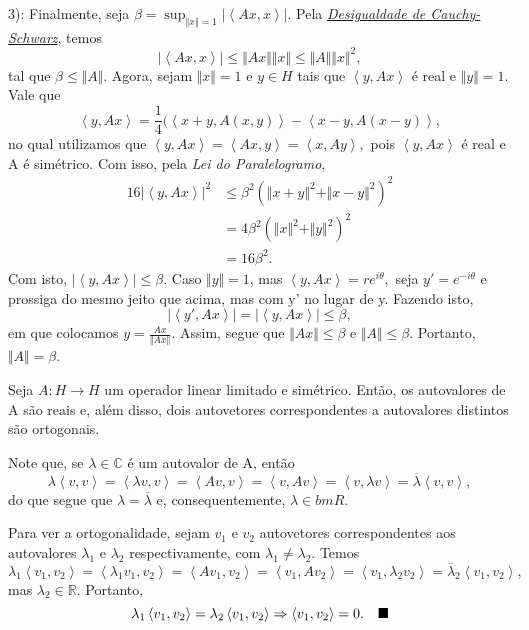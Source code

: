 \documentclass[measure_theory.tex]{subfiles}
\begin{document}
\begin{proof*}
	3): Finalmente, seja \(\beta = \sup_{\Vert x \Vert = 1}|\left< Ax, x \right>|\). Pela \hyperlink{cauchy_schwarz}{\textit{Desigualdade de Cauchy-Schwarz}}, temos
	\[
		|\left< Ax, x \right>|\leq \Vert Ax \Vert\Vert x \Vert \leq \Vert A \Vert\Vert x \Vert^{2},
	\]
	tal que \(\beta \leq \Vert A \Vert\). Agora, sejam \(\Vert x \Vert = 1\) e \(y\in H\) tais que \(\left< y, Ax \right>\) é real e \(\Vert y \Vert = 1.\) Vale que
	\[
		\left< y, Ax \right> = \frac{1}{4}(\left< x + y, A(x, y) \right> - \left< x - y, A(x-y) \right>,
	\]
	no qual utilizamos que \(\left< y, Ax \right> = \left< Ax, y \right> = \left< x, Ay \right>,\) pois \(\left< y, Ax \right>\) é real e A é simétrico. Com isso, pela \textit{Lei do Paralelogramo},
	\begin{align*}
		16|\left< y, Ax \right>|^{2} & \leq \beta ^{2}(\Vert x + y \Vert^{2} + \Vert x-y \Vert^{2})^{2} \\
		                             & = 4\beta ^{2}(\Vert x \Vert^{2} + \Vert y \Vert^{2})^{2}         \\
		                             & = 16\beta ^{2}.
	\end{align*}
	Com isto, \(|\left< y, Ax \right>|\leq \beta \). Caso \(\Vert y \Vert = 1\), mas \(\left< y, Ax \right> = re^{i\theta },\) seja \(y'= e^{-i\theta }\) e prossiga do mesmo jeito que acima, mas com y' no lugar de y. Fazendo isto,
	\[
		|\left< y', Ax \right>| = |\left< y, Ax \right>| \leq \beta ,
	\]
	em que colocamos \(y = \frac{Ax}{\Vert Ax \Vert}.\) Assim, segue que \(\Vert Ax \Vert \leq \beta \) e \(\Vert A \Vert \leq \beta \). Portanto, \(\Vert A \Vert = \beta \). \qedsymbol
\end{proof*}
\begin{prop*}
	Seja \(A:H\rightarrow H\) um operador linear limitado e simétrico. Então, os autovalores de A são reais e, além disso, dois autovetores correspondentes a autovalores distintos são ortogonais.
\end{prop*}
\begin{proof*}
	Note que, se \(\lambda \in \mathbb{C}\) é um autovalor de A, então
	\[
		\lambda \left< v, v \right> = \left< \lambda v, v \right> = \left< Av, v \right> = \left< v, Av \right> = \left< v, \lambda v \right> = \overline{\lambda }\left< v, v \right>,
	\]
	do que segue que \(\lambda  = \overline{\lambda } \) e, consequentemente, \(\lambda \in bm  R\).

	Para ver a ortogonalidade, sejam \(v_1\) e \(v_2\) autovetores correspondentes aos autovalores \(\lambda _1\) e \(\lambda _2\) respectivamente, com \(\lambda _1\neq \lambda _2\). Temos
	\[
		\lambda _1 \left< v_1, v_2 \right> = \left< \lambda_1 v_1, v_2 \right> = \left< Av_1, v_2 \right> = \left< v_1, Av_2 \right> = \left< v_1, \lambda _2v_2 \right> = \overline{\lambda }_2\left< v_1, v_2 \right>,
	\]
	mas \(\lambda_2 \in \mathbb{R}\). Portanto,
	\[
		\lambda _1\left< v_1, v_2 \right>=\lambda _2 \left< v_1, v_2 \right> \Rightarrow \left< v_1, v_2 \right> = 0. \quad \text{$\blacksquare$}
	\]
\end{proof*}
\end{document}
